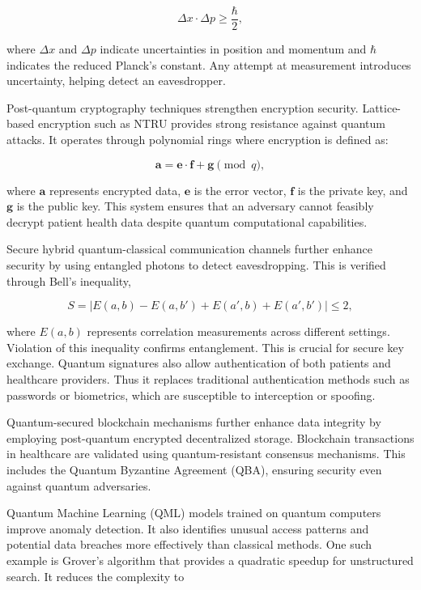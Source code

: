 \documentclass[pdflatex,sn-mathphys-num]{sn-jnl}
\theoremstyle{thmstyleone}%
\theoremstyle{thmstyletwo}%
\theoremstyle{thmstylethree}%
\begin{document}
\begin{equation}  
\Delta x \cdot \Delta p \geq \frac{\hbar}{2},  
\end{equation}  

where \( \Delta x \) and \( \Delta p \) indicate uncertainties in position and momentum and \( \hbar \) indicates the reduced Planck's constant. Any attempt at measurement introduces uncertainty, helping detect an eavesdropper.  

Post-quantum cryptography techniques strengthen encryption security. Lattice-based encryption such as NTRU provides strong resistance against quantum attacks\cite{bib12}. It operates through polynomial rings where encryption is defined as: 

\begin{equation}  
\mathbf{a} = \mathbf{e} \cdot \mathbf{f} + \mathbf{g} \pmod{q},  
\end{equation}  

where \( \mathbf{a} \) represents encrypted data, \( \mathbf{e} \) is the error vector, \( \mathbf{f} \) is the private key, and \( \mathbf{g} \) is the public key. This system ensures that an adversary cannot feasibly decrypt patient health data despite quantum computational capabilities.  

Secure hybrid quantum-classical communication channels further enhance security by using entangled photons to detect eavesdropping. This is verified through Bell’s inequality,  

\begin{equation}  
S = |E(a, b) - E(a, b') + E(a', b) + E(a', b')| \leq 2,  
\end{equation}  

where \( E(a, b) \) represents correlation measurements across different settings. Violation of this inequality confirms entanglement. This is crucial for secure key exchange. Quantum signatures also allow authentication of both patients and healthcare providers. Thus it replaces traditional authentication methods such as passwords or biometrics, which are susceptible to interception or spoofing.  

Quantum-secured blockchain mechanisms further enhance data integrity by employing post-quantum encrypted decentralized storage. Blockchain transactions in healthcare are validated using quantum-resistant consensus mechanisms. This includes the Quantum Byzantine Agreement (QBA), ensuring security even against quantum adversaries.  

Quantum Machine Learning (QML)\cite{bib13} models trained on quantum computers improve anomaly detection. It also identifies unusual access patterns and potential data breaches more effectively than classical methods. One such example is Grover’s algorithm that provides a quadratic speedup for unstructured search. It reduces the complexity to  
\end{document}
